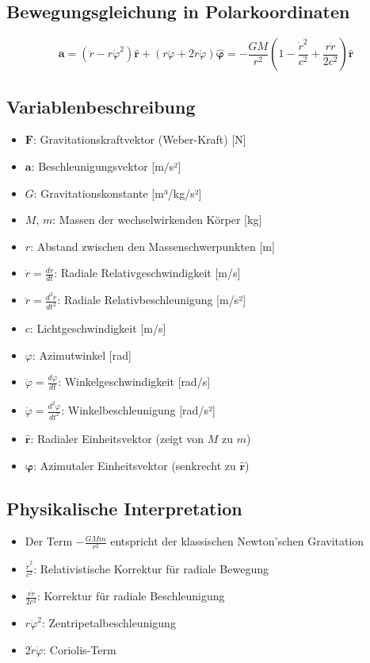 \subsection*{Bewegungsgleichung in Polarkoordinaten}
\begin{equation}\label{eq:weber_bewegungsgleichung}
\mathbf{a} = \left(\ddot{r} - r\dot{\varphi}^2\right)\mathbf{\hat{r}} + \left(r\ddot{\varphi} + 2\dot{r}\dot{\varphi}\right)\mathbf{\hat{\varphi}} = -\frac{GM}{r^2}\left(1 - \frac{\dot{r}^2}{c^2} + \frac{r\ddot{r}}{2c^2}\right)\mathbf{\hat{r}}
\end{equation}

\subsection*{Variablenbeschreibung}
\begin{itemize}[leftmargin=*,noitemsep]
    \item $\mathbf{F}$: Gravitationskraftvektor (Weber-Kraft) [N]
    \item $\mathbf{a}$: Beschleunigungsvektor [m/s²]
    \item $G$: Gravitationskonstante [m³/kg/s²]
    \item $M$, $m$: Massen der wechselwirkenden Körper [kg]
    \item $r$: Abstand zwischen den Massenschwerpunkten [m]
    \item $\dot{r} = \frac{dr}{dt}$: Radiale Relativgeschwindigkeit [m/s]
    \item $\ddot{r} = \frac{d^2r}{dt^2}$: Radiale Relativbeschleunigung [m/s²]
    \item $c$: Lichtgeschwindigkeit [m/s]
    \item $\varphi$: Azimutwinkel [rad]
    \item $\dot{\varphi} = \frac{d\varphi}{dt}$: Winkelgeschwindigkeit [rad/s]
    \item $\ddot{\varphi} = \frac{d^2\varphi}{dt^2}$: Winkelbeschleunigung [rad/s²]
    \item $\mathbf{\hat{r}}$: Radialer Einheitsvektor (zeigt von $M$ zu $m$)
    \item $\mathbf{\hat{\varphi}}$: Azimutaler Einheitsvektor (senkrecht zu $\mathbf{\hat{r}}$)
\end{itemize}

\subsection*{Physikalische Interpretation}
\begin{itemize}[leftmargin=*,noitemsep]
    \item Der Term $-\frac{GMm}{r^2}$ entspricht der klassischen Newton'schen Gravitation
    \item $\frac{\dot{r}^2}{c^2}$: Relativistische Korrektur für radiale Bewegung
    \item $\frac{r\ddot{r}}{2c^2}$: Korrektur für radiale Beschleunigung
    \item $r\dot{\varphi}^2$: Zentripetalbeschleunigung
    \item $2\dot{r}\dot{\varphi}$: Coriolis-Term
\end{itemize}
